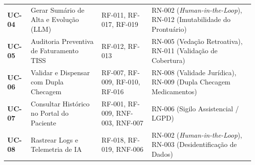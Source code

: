 \begin{xltabular}{\textwidth}{l >{\raggedright\arraybackslash}p{4.2cm} >{\raggedright\arraybackslash}p{4.0cm} >{\raggedright\arraybackslash}X}
\textbf{UC-04} & 
Gerar Sumário de Alta e Evolução (LLM) & 
RF-011, RF-017, RF-019 & 
RN-002 (\textit{Human-in-the-Loop}), RN-012 (Imutabilidade do Prontuário) \\
\addlinespace

\textbf{UC-05} & 
Auditoria Preventiva de Faturamento TISS & 
RF-012, RF-013 & 
RN-005 (Vedação Retroativa), RN-011 (Validação de Cobertura) \\
\addlinespace

\textbf{UC-06} & 
Validar e Dispensar com Dupla Checagem & 
RF-007, RF-009, RF-010, RF-016 & 
RN-008 (Validade Jurídica), RN-009 (Dupla Checagem Medicamentos) \\
\addlinespace

\textbf{UC-07} & 
Consultar Histórico no Portal do Paciente & 
RF-001, RF-009, RNF-003, RNF-007 & 
RN-006 (Sigilo Assistencial / LGPD) \\
\addlinespace

\textbf{UC-08} & 
Rastrear Logs e Telemetria de IA & 
RF-018, RF-019, RNF-006 & 
RN-002 (\textit{Human-in-the-Loop}), RN-003 (Desidentificação de Dados) \\

\end{xltabular}
\endgroup
